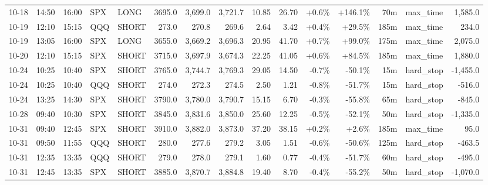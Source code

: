 \documentclass[11pt,a4paper,twoside]{article}
\begin{document}
\begin{landscape}
\begin{center}
\begin{longtable}{>{\color{txtmain}}l l l l l r r r r r r r r >{\color{txtmain}}l r}
10-18 & 14:50 & 16:00 & SPX & LONG & 3695.0 & 3,699.0 & 3,721.7 & 10.85 & 26.70 & \textcolor{wingreen}{+0.6\%} & \textcolor{wingreen}{+146.1\%} & 70m & max\_time & \textcolor{wingreen}{1,585.0} \\
10-19 & 12:10 & 15:15 & QQQ & SHORT & 273.0 & 270.8 & 269.6 & 2.64 & 3.42 & \textcolor{wingreen}{+0.4\%} & \textcolor{wingreen}{+29.5\%} & 185m & max\_time & \textcolor{wingreen}{234.0} \\
10-19 & 13:05 & 16:00 & SPX & LONG & 3655.0 & 3,669.2 & 3,696.3 & 20.95 & 41.70 & \textcolor{wingreen}{+0.7\%} & \textcolor{wingreen}{+99.0\%} & 175m & max\_time & \textcolor{wingreen}{2,075.0} \\
10-20 & 12:10 & 15:15 & SPX & SHORT & 3715.0 & 3,697.9 & 3,674.3 & 22.25 & 41.05 & \textcolor{wingreen}{+0.6\%} & \textcolor{wingreen}{+84.5\%} & 185m & max\_time & \textcolor{wingreen}{1,880.0} \\
10-24 & 10:25 & 10:40 & SPX & SHORT & 3765.0 & 3,744.7 & 3,769.3 & 29.05 & 14.50 & \textcolor{lossred}{-0.7\%} & \textcolor{lossred}{-50.1\%} & 15m & hard\_stop & \textcolor{lossred}{-1,455.0} \\
10-24 & 10:25 & 10:40 & QQQ & SHORT & 274.0 & 272.3 & 274.5 & 2.50 & 1.21 & \textcolor{lossred}{-0.8\%} & \textcolor{lossred}{-51.7\%} & 15m & hard\_stop & \textcolor{lossred}{-516.0} \\
10-24 & 13:25 & 14:30 & SPX & SHORT & 3790.0 & 3,780.0 & 3,790.7 & 15.15 & 6.70 & \textcolor{lossred}{-0.3\%} & \textcolor{lossred}{-55.8\%} & 65m & hard\_stop & \textcolor{lossred}{-845.0} \\
10-28 & 09:40 & 10:30 & SPX & SHORT & 3845.0 & 3,831.6 & 3,850.0 & 25.60 & 12.25 & \textcolor{lossred}{-0.5\%} & \textcolor{lossred}{-52.1\%} & 50m & hard\_stop & \textcolor{lossred}{-1,335.0} \\
10-31 & 09:40 & 12:45 & SPX & SHORT & 3910.0 & 3,882.0 & 3,873.0 & 37.20 & 38.15 & \textcolor{wingreen}{+0.2\%} & \textcolor{wingreen}{+2.6\%} & 185m & max\_time & \textcolor{wingreen}{95.0} \\
10-31 & 09:50 & 11:55 & QQQ & SHORT & 280.0 & 277.6 & 279.2 & 3.05 & 1.51 & \textcolor{lossred}{-0.6\%} & \textcolor{lossred}{-50.6\%} & 125m & hard\_stop & \textcolor{lossred}{-463.5} \\
10-31 & 12:35 & 13:35 & QQQ & SHORT & 279.0 & 278.0 & 279.1 & 1.60 & 0.77 & \textcolor{lossred}{-0.4\%} & \textcolor{lossred}{-51.7\%} & 60m & hard\_stop & \textcolor{lossred}{-495.0} \\
10-31 & 12:45 & 13:35 & SPX & SHORT & 3885.0 & 3,870.7 & 3,884.8 & 19.40 & 8.70 & \textcolor{lossred}{-0.4\%} & \textcolor{lossred}{-55.2\%} & 50m & hard\_stop & \textcolor{lossred}{-1,070.0} \\

\end{longtable}
\end{center}
\end{landscape}
\end{document}
